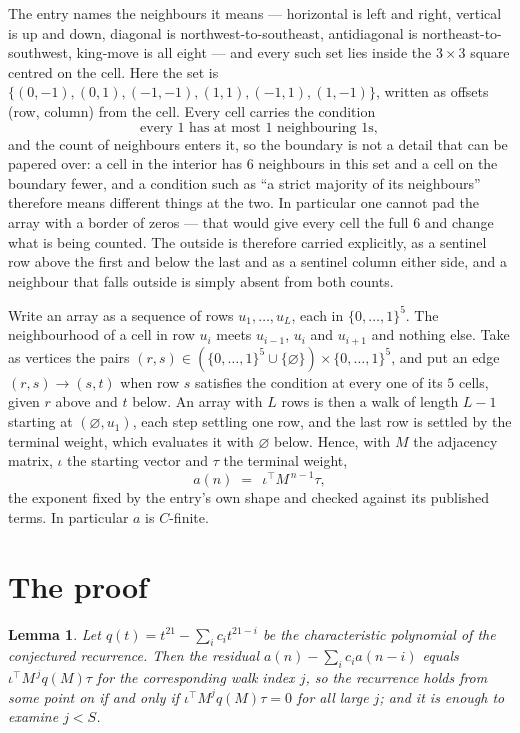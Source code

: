 \documentclass[11pt,a4paper]{article}
\theoremstyle{plain}
\newtheorem{lemma}[theorem]{Lemma}
\theoremstyle{definition}
\begin{document}
The entry names the neighbours it means --- horizontal is left and right, vertical is up and
down, diagonal is northwest-to-southeast, antidiagonal is northeast-to-southwest, king-move is
all eight --- and every such set lies inside the $3\times3$ square centred on the cell. Here
the set is $\{(0,-1), (0,1), (-1,-1), (1,1), (-1,1), (1,-1)\}$, written as offsets (row, column) from the cell. Every cell carries
the condition
\[
\text{every 1 has at most 1 neighbouring 1s},
\]
and the count of neighbours enters it, so the boundary is not a detail that can be papered
over: a cell in the interior has $6$ neighbours in this set and a cell on the boundary
fewer, and a condition such as ``a strict majority of its neighbours'' therefore means
different things at the two. In particular one cannot pad the array with a border of zeros ---
that would give every cell the full $6$ and change what is being counted. The outside is
therefore carried
explicitly, as a sentinel row above the first and below the last and as a sentinel column
either side, and a neighbour that falls outside is simply absent from both counts.

Write an array as a sequence of rows $u_1,\dots,u_L$, each in
$\{0,\dots,1\}^{5}$. The neighbourhood of a cell in row $u_i$ meets $u_{i-1}$,
$u_i$ and $u_{i+1}$ and nothing else. Take as vertices the pairs
$(r,s)\in(\{0,\dots,1\}^{5}\cup\{\varnothing\})\times\{0,\dots,1\}^{5}$,
and put an edge $(r,s)\to(s,t)$ when row $s$ satisfies the condition at every one of its
$5$ cells, given $r$ above and $t$ below. An array with $L$ rows is then a walk of length
$L-1$ starting at $(\varnothing,u_1)$, each step settling one row, and the last row is
settled by the terminal weight, which evaluates it with $\varnothing$ below. Hence,
with $M$ the adjacency matrix, $\iota$ the starting vector and $\tau$ the terminal weight,
\[
a(n)\;=\;\,\iota^{\!\top}M^{\,n-1}\tau ,
\]
the exponent fixed by the entry's own shape and checked against its published terms. In
particular $a$ is $C$-finite.

\section{The proof}

\begin{lemma}\label{lem:crit}
Let $q(t)=t^{21}-\sum_i c_it^{21-i}$ be the characteristic polynomial of the
conjectured recurrence. Then the residual $a(n)-\sum_ic_ia(n-i)$ equals
$\iota^{\!\top}M^{\,j}q(M)\tau$ for the corresponding walk index $j$, so the
recurrence holds from some point on if and only if $\iota^{\!\top}M^{j}q(M)\tau=0$ for all
large $j$; and it is enough to examine $j<S$.
\end{lemma}
\end{document}
